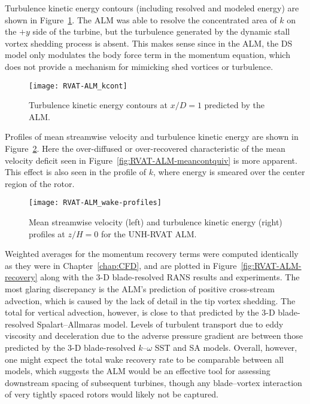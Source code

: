 Turbulence kinetic energy contours (including resolved and modeled energy) are
shown in Figure~\ref{fig:RVAT-ALM-kcont}. The ALM was able to resolve the
concentrated area of $k$ on the $+y$ side of the turbine, but the turbulence
generated by the dynamic stall vortex shedding process is absent. This makes
sense since in the ALM, the DS model only modulates the body force term in the
momentum equation, which does not provide a mechanism for mimicking shed
vortices or turbulence.

\begin{figure}
    \centering

    \texttt{[image: RVAT-ALM\_kcont]}
    
    \caption{Turbulence kinetic energy contours at $x/D=1$ predicted by the
        ALM.}
    
    \label{fig:RVAT-ALM-kcont}
\end{figure}

Profiles of mean streamwise velocity and turbulence kinetic energy are shown in
Figure~\ref{fig:RVAT-ALM-profiles}. Here the over-diffused or over-recovered
characteristic of the mean velocity deficit seen in
Figure~\ref{fig:RVAT-ALM-meancontquiv} is more apparent. This effect is also
seen in the profile of $k$, where energy is smeared over the center region of
the rotor.

\begin{figure}
    \centering
    
    \texttt{[image: RVAT-ALM\_wake-profiles]}
    
    \caption{Mean streamwise velocity (left) and turbulence kinetic energy
        (right) profiles at $z/H=0$ for the UNH-RVAT ALM.}
    
    \label{fig:RVAT-ALM-profiles}
\end{figure}

Weighted averages for the momentum recovery terms were computed identically as
they were in Chapter~\ref{chap:CFD}, and are plotted in
Figure~\ref{fig:RVAT-ALM-recovery} along with the 3-D blade-resolved RANS
results and experiments. The most glaring discrepancy is the ALM's prediction of
positive cross-stream advection, which is caused by the lack of detail in the
tip vortex shedding. The total for vertical advection, however, is close to that
predicted by the 3-D blade-resolved Spalart--Allmaras model. Levels of turbulent
transport due to eddy viscosity and deceleration due to the adverse pressure
gradient are between those predicted by the 3-D blade-resolved $k$--$\omega$ SST
and SA models. Overall, however, one might expect the total wake recovery rate
to be comparable between all models, which suggests the ALM would be an
effective tool for assessing downstream spacing of subsequent turbines, though
any blade--vortex interaction of very tightly spaced rotors would likely not be
captured.

